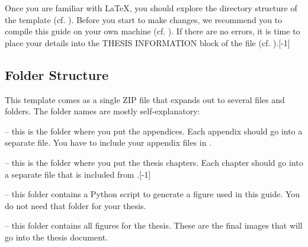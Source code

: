 Once you are familiar with LaTeX, you should explore the directory structure of the template (cf. ). Before you start to make changes, we recommend you to compile this guide on your own machine (cf. ). If there are no errors, it is time to place your details into the THESIS INFORMATION block of the  file (cf. ).[-1\baselineskip]


\subsection{Folder Structure}
\label{sec:folders}

This template comes as a single ZIP file that expands out to several files and folders. The folder names are mostly self-explanatory:

 -- this is the folder where you put the appendices. Each appendix should go into a separate  file. You have to include your appendix files in .

 -- this is the folder where you put the thesis chapters. Each chapter should go into a separate  file that is included from .[-1\baselineskip]

 -- this folder contains a Python script to generate a figure used in this guide. You do not need that folder for your thesis.

 -- this folder contains all figures for the thesis. These are the final images that will go into the thesis document.

